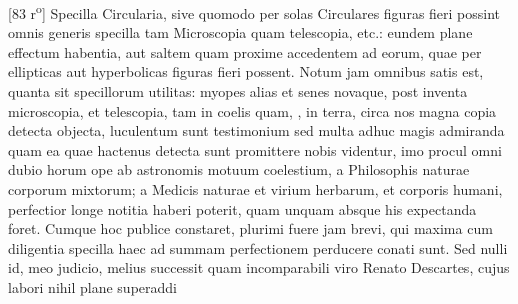                 \vspace*{8mm}
                \pstart 
                \normalsize
            [83 r\textsuperscript{o}] Specilla Circularia\protect{}, sive quomodo per solas  Circulares figuras fieri possint omnis generis specilla\protect{}  tam Microscopia\protect{} quam telescopia\protect{}, etc.: eundem plane  effectum habentia, aut saltem quam proxime accedentem  ad eorum, quae per ellipticas aut hyperbolicas figuras  fieri possent. \pend \pstart  Notum jam omnibus satis est, quanta sit specillorum\protect{}  utilitas: myopes\protect{} alias et senes novaque, post inventa microscopia\protect{}, et telescopia\protect{}, tam in coelis quam, , in terra, circa  nos magna copia detecta objecta, luculentum sunt testimonium  sed multa adhuc magis admiranda quam ea quae hactenus  detecta sunt promittere nobis videntur, imo procul omni  dubio horum ope ab astronomis motuum coelestium, a  Philosophis naturae corporum mixtorum; a Medicis  naturae et virium herbarum, et corporis humani, perfectior  longe notitia haberi poterit, quam unquam absque his  expectanda foret. Cumque hoc publice constaret, plurimi  fuere jam brevi, qui maxima cum diligentia specilla\protect{}  haec ad summam perfectionem perducere conati sunt. Sed  nulli id, meo judicio, melius successit quam incomparabili  viro Renato Descartes\protect{}, cujus labori nihil plane superaddi 